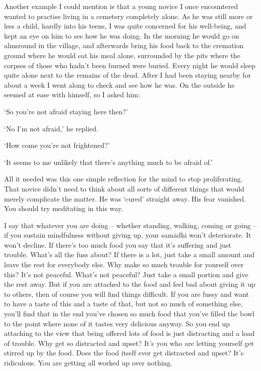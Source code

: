 Another example I could mention is that a young novice I once en\-coun\-tered wanted to practise living in a cemetery completely alone. As he was still more or less a child, hardly into his teens, I was quite concerned for his well-being, and kept an eye on him to see how he was doing. In the morning he would go on almsround in the village, and afterwards bring his food back to the cremation ground where he would eat his meal alone, surrounded by the pits where the corpses of those who hadn't been burned were buried. Every night he would sleep quite alone next to the remains of the dead. After I had been staying nearby for about a week I went along to check and see how he was. On the outside he seemed at ease with himself, so I asked him:

`So you're not afraid staying here then?'

`No I'm not afraid,' he replied.

`How come you're not frightened?'

`It seems to me unlikely that there's anything much to be afraid of.'

All it needed was this one simple reflection for the mind to stop proliferating. That novice didn't need to think about all sorts of different things that would merely complicate the matter. He was `cured' straight away. His fear vanished. You should try meditating in this way. 

I say that whatever you are doing -- whether standing, walking, coming or going -- if you sustain mindfulness without giving up, your sam\=adhi won't deteriorate. It won't decline. If there's too much food you say that it's suffering and just trouble. What's all the fuss about? If there is a lot, just take a small amount and leave the rest for everybody else. Why make so much trouble for yourself over this? It's not peaceful. What's not peaceful? Just take a small portion and give the rest away. But if you are attached to the food and feel bad about giving it up to others, then of course you will find things difficult. If you are fussy and want to have a taste of this and a taste of that, but not so much of something else, you'll find that in the end you've chosen so much food that you've filled the bowl to the point where none of it tastes very delicious anyway. So you end up attaching to the view that being offered lots of food is just distracting and a load of trouble. Why get so distracted and upset? It's you who are letting yourself get stirred up by the food. Does the food itself ever get distracted and upset? It's ridiculous. You are getting all worked up over nothing. 

